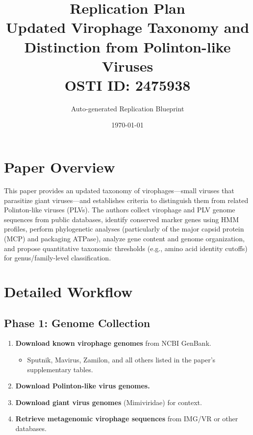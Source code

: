 \documentclass[11pt,a4paper]{article}
\title{\textbf{Replication Plan}\\[0.5em]
\large Updated Virophage Taxonomy and Distinction from Polinton-like Viruses\\[0.3em]
\normalsize OSTI ID: 2475938}
\author{Auto-generated Replication Blueprint}
\date{\today}
\begin{document}
\maketitle
\tableofcontents
\newpage

\section{Paper Overview}
This paper provides an updated taxonomy of virophages---small viruses that parasitize giant viruses---and establishes criteria to distinguish them from related Polinton-like viruses (PLVs). The authors collect virophage and PLV genome sequences from public databases, identify conserved marker genes using HMM profiles, perform phylogenetic analyses (particularly of the major capsid protein (MCP) and packaging ATPase), analyze gene content and genome organization, and propose quantitative taxonomic thresholds (e.g., amino acid identity cutoffs) for genus/family-level classification.

\section{Detailed Workflow}

\subsection{Phase 1: Genome Collection}
\begin{enumerate}[label=\textbf{1.\arabic*}]
  \item \textbf{Download known virophage genomes} from NCBI GenBank.
    \begin{itemize}
      \item Sputnik, Mavirus, Zamilon, and all others listed in the paper's supplementary tables.
    \end{itemize}
  \item \textbf{Download Polinton-like virus genomes.}
  \item \textbf{Download giant virus genomes} (Mimiviridae) for context.
  \item \textbf{Retrieve metagenomic virophage sequences} from IMG/VR or other databases.
\end{enumerate}
\end{document}
